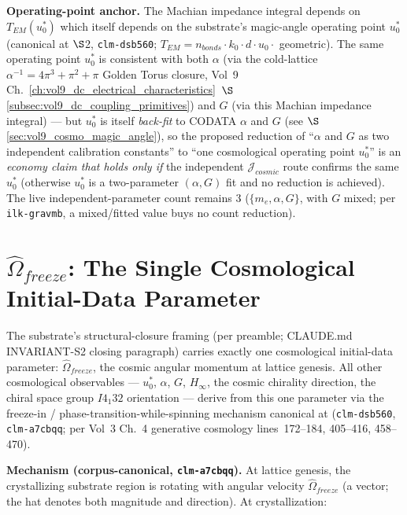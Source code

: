 \textbf{Operating-point anchor.} The Machian impedance integral depends on $T_{EM}(u_0^*)$ which itself depends on the substrate's magic-angle operating point $u_0^*$ (canonical at  $\S$2, \texttt{clm-dsb560}; $T_{EM} = n_{bonds} \cdot k_0 \cdot d \cdot u_0 \cdot$ geometric). The same operating point $u_0^*$ is consistent with both $\alpha$ (via the cold-lattice $\alpha^{-1} = 4\pi^3 + \pi^2 + \pi$ Golden Torus closure, Vol~9 Ch.~\ref{ch:vol9_dc_electrical_characteristics}~$\S$\ref{subsec:vol9_dc_coupling_primitives}) and $G$ (via this Machian impedance integral) --- but $u_0^*$ is itself \emph{back-fit} to CODATA $\alpha$ and $G$ (see $\S$\ref{sec:vol9_cosmo_magic_angle}), so the proposed reduction of ``$\alpha$ and $G$ as two independent calibration constants'' to ``one cosmological operating point $u_0^*$'' is an \emph{economy claim that holds only if} the independent $\mathcal{J}_{cosmic}$ route confirms the same $u_0^*$ (otherwise $u_0^*$ is a two-parameter $(\alpha,G)$ fit and no reduction is achieved). The live independent-parameter count remains 3 ($\{m_e, \alpha, G\}$, with $G$ mixed; per  \texttt{ilk-gravmb}, a mixed/fitted value buys no count reduction).

\section{$\hat{\Omega}_{freeze}$: The Single Cosmological Initial-Data Parameter}
\label{sec:vol9_cosmo_omega_freeze}

The substrate's structural-closure framing (per  preamble; CLAUDE.md INVARIANT-S2 closing paragraph) carries exactly one cosmological initial-data parameter: $\hat{\Omega}_{freeze}$, the cosmic angular momentum at lattice genesis. All other cosmological observables --- $u_0^*$, $\alpha$, $G$, $H_\infty$, the cosmic chirality direction, the chiral space group $I4_1 32$ orientation --- derive from this one parameter via the freeze-in / phase-transition-while-spinning mechanism canonical at  (\texttt{clm-dsb560}, \texttt{clm-a7cbqq}; per Vol~3 Ch.~4 generative cosmology lines~172--184, 405--416, 458--470).

\textbf{Mechanism (corpus-canonical, \texttt{clm-a7cbqq}).} At lattice genesis, the crystallizing substrate region is rotating with angular velocity $\hat{\Omega}_{freeze}$ (a vector; the hat denotes both magnitude and direction). At crystallization:

